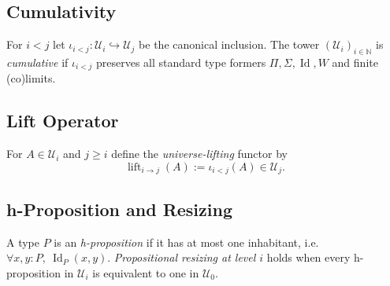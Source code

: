 \documentclass[a4paper,11pt]{article}
\begin{document}
\subsection{Cumulativity}
\begin{definition}[Cumulativity]\label{def:cumulativity}
For \(i<j\) let
\(\iota_{i<j}\colon\mathcal U_{i}\hookrightarrow\mathcal U_{j}\) be the
canonical inclusion.  The tower
\((\mathcal U_{i})_{i\in\mathbb{N}}\) is \emph{cumulative} if
\(\iota_{i<j}\) preserves all standard type formers
\(\Pi,\Sigma,\operatorname{Id},W\) and finite (co)limits.
\end{definition}

\subsection{Lift Operator}
\begin{definition}\label{def:lift}
For \(A\in\mathcal U_{i}\) and \(j\ge i\) define the
\emph{universe‐lifting} functor by
\[
  \operatorname{lift}_{i\to j}(A):=\iota_{i<j}(A)\in\mathcal U_{j}.
\]
\end{definition}

\subsection{h-Proposition and Resizing}
\begin{definition}\label{def:resizing}
A type \(P\) is an \emph{h-proposition} if it has at most one
inhabitant, i.e.\ \(\forall x,y:P,\ \operatorname{Id}_{P}(x,y)\).
\emph{Propositional resizing at level \(i\)} holds when every
h-proposition in \(\mathcal U_{i}\) is equivalent to one in
\(\mathcal U_{0}\).
\end{definition}
\end{document}
